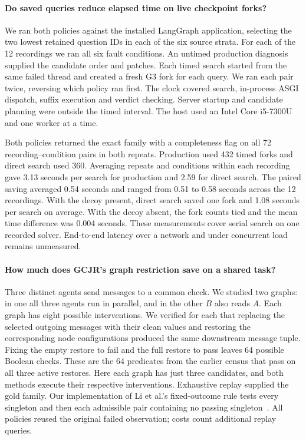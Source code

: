 \documentclass[11pt,letterpaper]{article}
\begin{document}
\paragraph{Do saved queries reduce elapsed time on live checkpoint forks?}
We ran both policies against the installed LangGraph application, selecting the two lowest retained question IDs in each of the six source strata. For each of the 12 recordings we ran all six fault conditions. An untimed production diagnosis supplied the candidate order and patches. Each timed search started from the same failed thread and created a fresh G3 fork for each query. We ran each pair twice, reversing which policy ran first. The clock covered search, in-process ASGI dispatch, suffix execution and verdict checking. Server startup and candidate planning were outside the timed interval. The host used an Intel Core i5-7300U and one worker at a time.

Both policies returned the exact family with a completeness flag on all 72 recording--condition pairs in both repeats. Production used 432 timed forks and direct search used 360. Averaging repeats and conditions within each recording gave 3.13 seconds per search for production and 2.59 for direct search. The paired saving averaged 0.54 seconds and ranged from 0.51 to 0.58 seconds across the 12 recordings. With the decoy present, direct search saved one fork and 1.08 seconds per search on average. With the decoy absent, the fork counts tied and the mean time difference was 0.004 seconds. These measurements cover serial search on one recorded solver. End-to-end latency over a network and under concurrent load remains unmeasured.

\paragraph{How much does GCJR's graph restriction save on a shared task?}\label{sec:shared}
Three distinct agents send messages to a common check. We studied two graphs: in one all three agents run in parallel, and in the other $B$ also reads $A$. Each graph has eight possible interventions. We verified for each that replacing the selected outgoing messages with their clean values and restoring the corresponding node configurations produced the same downstream message tuple. Fixing the empty restore to fail and the full restore to pass leaves 64 possible Boolean checks. These are the 64 predicates from the earlier census that pass on all three active restores. Here each graph has just three candidates, and both methods execute their respective interventions. Exhaustive replay supplied the gold family. Our implementation of Li et al.'s fixed-outcome rule tests every singleton and then each admissible pair containing no passing singleton~\cite{li}. All policies reused the original failed observation; costs count additional replay queries.
\end{document}
